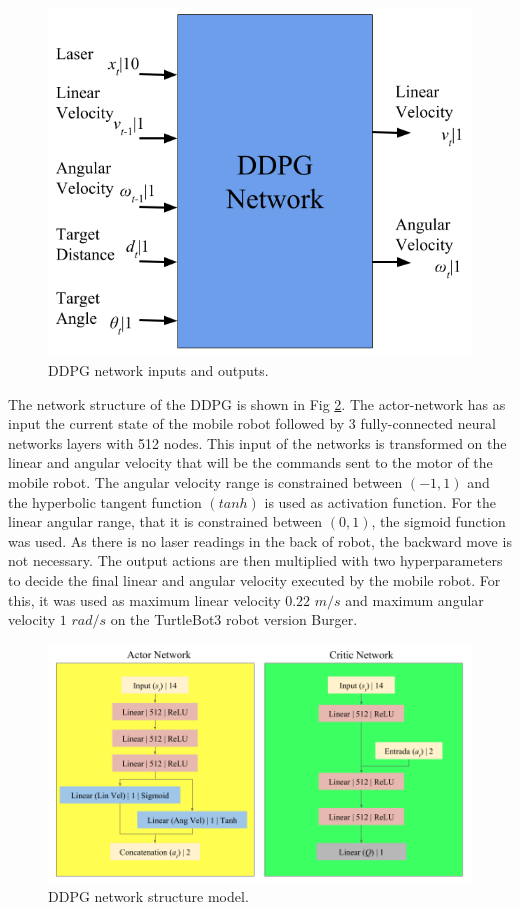 \begin{figure}
\centerline{\includegraphics[width=\columnwidth]{images/o_and_i.png}}
\caption{DDPG network inputs and outputs.}
\label{fig:entradaESaida}
\end{figure}

The network structure of the DDPG is shown in Fig \ref{fig:projetointegrador}. 
The actor-network has as input the current state of the mobile robot followed by 3 fully-connected neural networks layers with 512 nodes.
This input of the networks is transformed on the linear and angular velocity that will be the commands sent to the motor of the mobile robot. 
The angular velocity range is constrained between $(-1,1)$ and the hyperbolic tangent function $(tanh)$ is used as activation function.
For the linear angular range, that it is constrained between $(0,1)$, the sigmoid function was used.
As there is no laser readings in the back of robot, the backward move is not necessary.
The output actions are then multiplied with two hyperparameters to decide the final linear and angular velocity executed by the mobile robot.
For this, it was used as maximum linear velocity $0.22$ $m/s$ and maximum angular velocity $1$ $rad/s$ on the TurtleBot3 robot version Burger.


\begin{figure}
\centerline{\includegraphics[width=\columnwidth]{images/projeto_integrador_en.png}}
\caption{DDPG network structure model.}
\label{fig:projetointegrador}
\end{figure}

